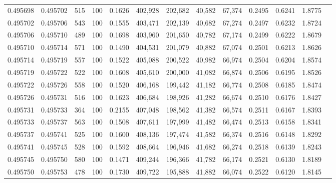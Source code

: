 \begin{tabular}{rrrrrrrrrrrrr}
0.495698 & 0.495702 &   515 & 100 &                                     0.1626 & 402,928 & 202,682 &  40,582 &  67,374 & 0.2495 & 0.6241 & 1.8775 \\
0.495702 & 0.495706 &   543 & 100 &                                     0.1555 & 403,471 & 202,139 &  40,682 &  67,274 & 0.2497 & 0.6232 & 1.8724 \\
0.495706 & 0.495710 &   489 & 100 &                                     0.1698 & 403,960 & 201,650 &  40,782 &  67,174 & 0.2499 & 0.6222 & 1.8679 \\
0.495710 & 0.495714 &   571 & 100 &                                     0.1490 & 404,531 & 201,079 &  40,882 &  67,074 & 0.2501 & 0.6213 & 1.8626 \\
0.495714 & 0.495719 &   557 & 100 &                                     0.1522 & 405,088 & 200,522 &  40,982 &  66,974 & 0.2504 & 0.6204 & 1.8574 \\
0.495719 & 0.495722 &   522 & 100 &                                     0.1608 & 405,610 & 200,000 &  41,082 &  66,874 & 0.2506 & 0.6195 & 1.8526 \\
0.495722 & 0.495726 &   558 & 100 &                                     0.1520 & 406,168 & 199,442 &  41,182 &  66,774 & 0.2508 & 0.6185 & 1.8474 \\
0.495726 & 0.495731 &   516 & 100 &                                     0.1623 & 406,684 & 198,926 &  41,282 &  66,674 & 0.2510 & 0.6176 & 1.8427 \\
0.495731 & 0.495733 &   364 & 100 &                                     0.2155 & 407,048 & 198,562 &  41,382 &  66,574 & 0.2511 & 0.6167 & 1.8393 \\
0.495733 & 0.495737 &   563 & 100 &                                     0.1508 & 407,611 & 197,999 &  41,482 &  66,474 & 0.2513 & 0.6158 & 1.8341 \\
0.495737 & 0.495741 &   525 & 100 &                                     0.1600 & 408,136 & 197,474 &  41,582 &  66,374 & 0.2516 & 0.6148 & 1.8292 \\
0.495741 & 0.495745 &   528 & 100 &                                     0.1592 & 408,664 & 196,946 &  41,682 &  66,274 & 0.2518 & 0.6139 & 1.8243 \\
0.495745 & 0.495750 &   580 & 100 &                                     0.1471 & 409,244 & 196,366 &  41,782 &  66,174 & 0.2521 & 0.6130 & 1.8189 \\
0.495750 & 0.495753 &   478 & 100 &                                     0.1730 & 409,722 & 195,888 &  41,882 &  66,074 & 0.2522 & 0.6120 & 1.8145 \\

\end{tabular}
